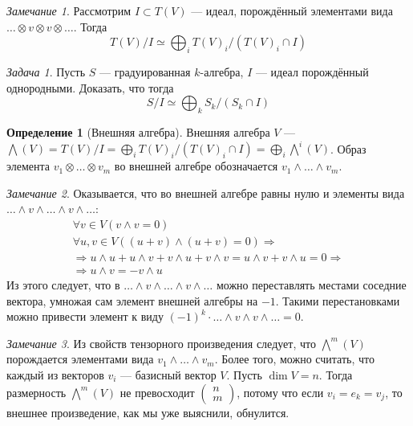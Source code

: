 \documentclass{article}
\theoremstyle{definition}
\newtheorem*{definition}{Определение}
\theoremstyle{remark}
\newtheorem*{remark}{Замечание}
\newtheorem{prb}{Задача}
\newenvironment{problem}
{\begin{prb}
\label{\theprb}}
{\end{prb}}
\newcommand{\Ra}{\Rightarrow}
\newcommand{\inter}{\cap}
\begin{document}
\begin{remark}
    Рассмотрим $I \subset T(V)$ --- идеал, порождённый элементами вида $\hdots \otimes v \otimes v \otimes \hdots$. Тогда
    \begin{equation*}
        T(V) / I \simeq \bigoplus_i T(V)_i / (T(V)_i \inter I)
    \end{equation*}
\end{remark}

\begin{problem}
    Пусть $S$ --- градуированная $k$-алгебра, $I$ --- идеал порождённый однородными. Доказать, что тогда
    \begin{equation*}
	S / I \simeq \bigoplus_k S_k / (S_k \inter I)
    \end{equation*}
\end{problem}

\begin{definition}[Внешняя алгебра]
    Внешняя алгебра $V$ --- $\bigwedge(V) = T(V) / I = \bigoplus_i T(V)_i / (T(V)_i \inter I) = \bigoplus_i \bigwedge^i(V)$. Образ элемента $v_1 \otimes \hdots \otimes v_m$ во внешней алгебре обозначается $v_1 \wedge \hdots \wedge v_m$.
\end{definition}

\begin{remark}
    Оказывается, что во внешней алгебре равны нулю и элементы вида $\hdots \wedge v \wedge \hdots \wedge v \wedge \hdots$:
    \begin{gather*}
        \forall v \in V (v \wedge v = 0) \\
        \forall u,v \in V \left( (u + v) \wedge (u + v) = 0 \right) \Ra \\
        \Ra u \wedge u + u \wedge v + v \wedge u + v \wedge v = u \wedge v + v \wedge u = 0 \Ra \\
        \Ra u \wedge v = - v \wedge u
    \end{gather*}
    Из этого следует, что в $\hdots \wedge v \wedge \hdots \wedge v \wedge \hdots$ можно переставлять местами соседние вектора, умножая сам элемент внешней алгебры на $-1$. Такими перестановками можно привести элемент к виду $(-1)^k \cdot \hdots \wedge v \wedge v \wedge \hdots = 0$.
\end{remark}

\begin{remark}
    Из свойств тензорного произведения следует, что $\bigwedge^m(V)$ порождается элементами вида $v_1 \wedge \hdots \wedge v_m$. Более того, можно считать, что каждый из векторов $v_i$ --- базисный вектор $V$. Пусть $\dim V = n$. Тогда размерность $\bigwedge^m(V)$ не превосходит $\begin{pmatrix}
        n \\ m
    \end{pmatrix}$, потому что если $v_i = e_k = v_j$, то внешнее произведение, как мы уже выяснили, обнулится.
\end{remark}
\end{document}
